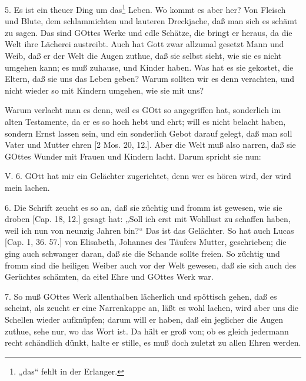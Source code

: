 5. Es ist ein theuer Ding um das\footnote{„das“ fehlt in der Erlanger.} Leben. Wo kommt es aber her? Von Fleisch und Blute, dem schlammichten und lauteren Dreckjache, daß man sich es schämt zu sagen. Das sind GOttes Werke und edle Schätze, die bringt er heraus, da die Welt ihre Lächerei austreibt. Auch hat Gott zwar allzumal gesetzt Mann und Weib, daß er der Welt die Augen zuthue, daß sie selbst sieht, wie sie es nicht umgehen kann; es muß zuhause, und Kinder haben. Was hat es sie gekostet, die Eltern, daß sie uns das Leben geben? Warum sollten wir es denn verachten, und nicht wieder so mit Kindern umgehen, wie sie mit uns?

Warum verlacht man es denn, weil es GOtt so angegriffen hat, sonderlich im alten Testamente, da er es so hoch hebt und ehrt; will es nicht belacht haben, sondern Ernst lassen sein, und ein sonderlich Gebot darauf gelegt, daß man soll Vater und Mutter ehren [2 Mos. 20, 12.]. Aber die Welt muß also narren, daß sie GOttes Wunder mit Frauen und Kindern lacht. Darum spricht sie nun:

\begin{schriftzitat}
V. 6. GOtt hat mir ein Gelächter zugerichtet, denn wer es hören wird, der wird mein lachen.
\end{schriftzitat}

6. Die Schrift zeucht es so an, daß sie züchtig und fromm ist gewesen, wie sie droben [Cap. 18, 12.] gesagt hat: „Soll ich erst mit Wohllust zu schaffen haben, weil ich nun von neunzig Jahren bin?“ Das ist das Gelächter. So hat auch Lucas [Cap. 1, 36. 57.] von Elisabeth, Johannes des Täufers Mutter, geschrieben; die ging auch schwanger daran, daß sie die Schande sollte freien. So züchtig und fromm sind die heiligen Weiber auch vor der Welt gewesen, daß sie sich auch des Gerüchtes schämten, da eitel Ehre und GOttes Werk war.

7. So muß GOttes Werk allenthalben lächerlich und spöttisch gehen, daß es scheint, als zeucht er eine Narrenkappe an, läßt es wohl lachen, wird aber uns die Schellen wieder aufknüpfen; darum will er haben, daß ein jeglicher die Augen zuthue, sehe nur, wo das Wort ist. Da hält er groß von; ob es gleich jedermann recht schändlich dünkt, halte er stille, es muß doch zuletzt zu allen Ehren werden.

